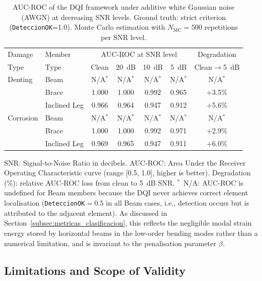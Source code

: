 \documentclass[preprint,12pt]{elsarticle}
\begin{document}
\clearpage
\begin{table}[!ht]
  \centering
  \caption{AUC-ROC of the DQI framework under additive white Gaussian noise (AWGN) at decreasing SNR levels. Ground truth: strict criterion (\texttt{DeteccionOK}=1.0). Monte Carlo estimation with $N_{\text{MC}}=500$ repetitions per SNR level.}
  \label{tab:snr_robustness}
  \begin{tabular}{llccccc}
    \toprule
    Damage & Member & \multicolumn{4}{c}{AUC-ROC at SNR level} & Degradation \\
    Type & Type & Clean & 20~dB & 10~dB & 5~dB & Clean$\to$5~dB \\
    \midrule
    Denting & Beam & N/A$^*$ & N/A$^*$ & N/A$^*$ & N/A$^*$ & N/A$^*$ \\
     & Brace & 1.000 & 1.000 & 0.992 & 0.965 & +3.5\% \\
     & Inclined Leg & 0.966 & 0.964 & 0.947 & 0.912 & +5.6\% \\
    \midrule
    Corrosion & Beam & N/A$^*$ & N/A$^*$ & N/A$^*$ & N/A$^*$ & N/A$^*$ \\
     & Brace & 1.000 & 1.000 & 0.992 & 0.971 & +2.9\% \\
     & Inclined Leg & 0.969 & 0.965 & 0.947 & 0.911 & +6.0\% \\
    \bottomrule
  \end{tabular}
  \par\smallskip
  {\footnotesize\raggedright
  SNR: Signal-to-Noise Ratio in decibels. AUC-ROC: Area Under the Receiver
  Operating Characteristic curve (range [0.5, 1.0], higher is better).
  Degradation (\%): relative AUC-ROC loss from clean to 5~dB SNR.
  $^*$~N/A: AUC-ROC is undefined for Beam members because the DQI never achieves
  correct element localisation (\texttt{DeteccionOK}$=0.5$ in all Beam cases, i.e.,
  detection occurs but is attributed to the adjacent element). As discussed in
  Section~\ref{subsec:metricas_clasificacion}, this reflects the negligible modal strain
  energy stored by horizontal beams in the low-order bending modes rather than a numerical
  limitation, and is invariant to the penalisation parameter $\beta$.
  \par}
\end{table}

\FloatBarrier
\subsection{Limitations and Scope of Validity}
\label{subsec:limitaciones}
\end{document}
